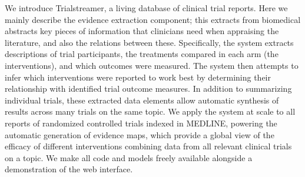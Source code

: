 We introduce Trialstreamer, a living database of clinical trial reports. Here we mainly describe the evidence extraction component; this extracts from biomedical abstracts key pieces of information that clinicians need when appraising the literature, and also the relations between these. Specifically, the system extracts descriptions of trial participants, the treatments compared in each arm (the interventions), and which outcomes were measured. The system then attempts to infer which interventions were reported to work best by determining their relationship with identified trial outcome measures. In addition to summarizing individual trials, these extracted data elements allow automatic synthesis of results across many trials on the same topic. We apply the system at scale to all reports of randomized controlled trials indexed in MEDLINE, powering the automatic generation of evidence maps, which provide a global view of the efficacy of different interventions combining data from all relevant clinical trials on a topic. We make all code and models freely available alongside a demonstration of the web interface.
